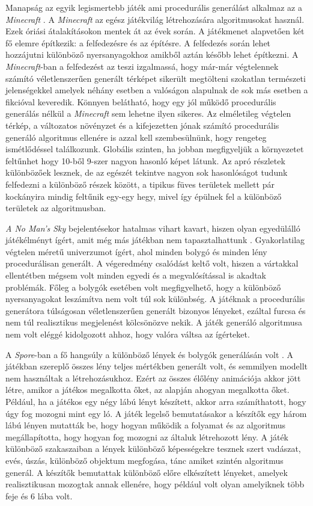 Manapság az egyik legismertebb játék ami procedurális generálást alkalmaz az a \textit{Minecraft} \cite{minecraft}. A \textit{Minecraft} az egész játékvilág létrehozására algoritmusokat használ. Ezek óriási átalakításokon mentek át az évek során. A játékmenet alapvetően két fő elemre építkezik: a felfedezésre és az építésre. A felfedezés során lehet hozzájutni különböző nyersanyagokhoz amikből aztán később lehet építkezni. A \textit{Minecraft}-ban a felfedezést az teszi izgalmassá, hogy már-már végtelennek számító véletlenszerűen generált térképet sikerült megtölteni szokatlan természeti jelenségekkel amelyek néhány esetben a valóságon alapulnak de sok más esetben a fikcióval keveredik. Könnyen belátható, hogy egy jól működő procedurális generálás nélkül a \textit{Minecraft} sem lehetne ilyen sikeres. Az elméletileg végtelen térkép, a változatos növényzet és a kifejezetten jónak számító procedurális generáló algoritmus ellenére is azzal kell szembesülnünk, hogy rengeteg ismétlődéssel találkozunk. Globális szinten, ha jobban megfigyeljük a környezetet feltűnhet hogy 10-ből 9-szer nagyon hasonló képet látunk. Az apró részletek különbözőek lesznek, de az egészét tekintve nagyon sok hasonlóságot tudunk felfedezni a különböző részek között, a tipikus füves területek mellett pár kockányira mindig feltűnik egy-egy hegy, mivel így épülnek fel a különböző területek az algoritmusban. 

\textit{A No Man’s Sky} bejelentésekor hatalmas vihart kavart, hiszen olyan egyedülálló játékélményt ígért, amit még más játékban nem tapasztalhattunk \cite{nomansky}. Gyakorlatilag végtelen méretű univerzumot ígért, ahol minden bolygó és minden lény procedurálisan generált. A végeredmény csalódást keltő volt, hiszen a vártakkal ellentétben mégsem volt minden egyedi és a megvalósítással is akadtak problémák. Főleg a bolygók esetében volt megfigyelhető, hogy a különböző nyersanyagokat leszámítva nem volt túl sok különbség. A játéknak a procedurális generátora túlságosan véletlenszerűen generált bizonyos lényeket, ezáltal furcsa és nem túl realisztikus megjelenést kölcsönözve nekik. A játék generáló algoritmusa nem volt eléggé kidolgozott ahhoz, hogy valóra váltsa az ígérteket.

A \textit{Spore}-ban a fő hangsúly a különböző lények és bolygók generálásán volt \cite{spore}. A játékban szereplő összes lény teljes mértékben generált volt, és semmilyen modellt nem használtak a létrehozásukhoz. Ezért az összes élőlény animációja akkor jött létre, amikor a játékos megalkotta őket, az alapján ahogyan megalkotta őket. Például, ha a játékos egy négy lábú lényt készített, akkor arra számíthatott, hogy úgy fog mozogni mint egy ló. A játék legelső bemutatásakor a készítők egy három lábú lényen mutatták be, hogy hogyan működik a folyamat és az algoritmus megállapította, hogy hogyan fog mozogni az általuk létrehozott lény. A játék különböző szakaszaiban a lények különböző képességekre tesznek szert vadászat, evés, úszás, különböző objektum megfogása, tánc amiket szintén algoritmus generál. A készítők bemutattak különböző előre elkészített lényeket, amelyek realisztikusan mozogtak annak ellenére, hogy például volt olyan amelyiknek több feje és 6 lába volt.


